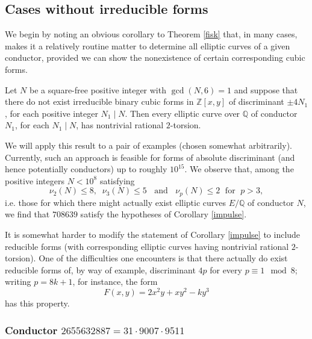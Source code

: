 \subsection{Cases without irreducible forms} \label{lapel}

We begin by noting an obvious corollary to Theorem \ref{fisk} that, in many cases, makes it a relatively routine matter to determine all elliptic curves of a given conductor, provided  we can show the nonexistence of certain corresponding cubic forms.
\begin{corollary} \label{impulse}
Let $N$ be a square-free positive integer with $\gcd(N,6)=1$ and suppose that there do not exist irreducible binary cubic forms in $\mathbb{Z}[x,y]$ of discriminant $\pm 4N_1$, for each positive integer $N_1 \mid N$. Then every elliptic curve over $\mathbb{Q}$ of conductor $N_1$,  for each  $N_1 \mid N$, has nontrivial rational $2$-torsion.
\end{corollary}

We will apply this result to  a pair of examples (chosen somewhat  arbitrarily). Currently, such an approach is feasible for forms of absolute discriminant (and hence potentially conductors) up to roughly $10^{15}$. 
We observe that, among the positive integers $N < 10^8$ satisfying
$$
\nu_2(N) \leq 8, \; \; \nu_3 (N) \leq 5 \; \; \mbox{ and } \; \; \nu_p (N) \leq 2 \; \mbox{ for } \; p > 3,
$$
i.e. those for which there might actually exist elliptic curves $E/\mathbb{Q}$ of conductor $N$, we find that $708639$ satisfy the hypotheses of Corollary \ref{impulse}. 

It is somewhat harder to modify the statement of Corollary \ref{impulse} to include reducible forms (with corresponding elliptic curves having nontrivial rational $2$-torsion). One of the difficulties one encounters is that there actually do exist reducible forms of, by way of example, discriminant $4p$ for every $p \equiv 1 \mod{8}$; writing $p = 8k+1$, for instance, the form
$$
F(x,y) = 2 x^2y+xy^2-ky^3
$$
has this property.

\subsubsection{Conductor $2655632887 = 31 \cdot 9007 \cdot 9511$}

